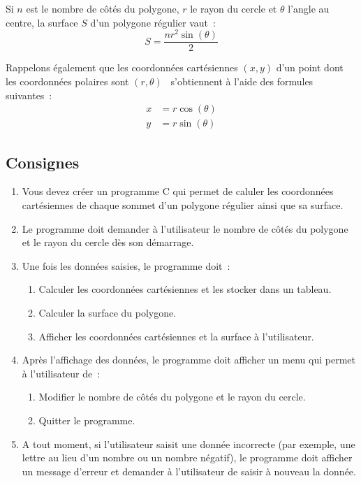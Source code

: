 \documentclass[12pt,addpoints,french,a4paper,oneside]{exam}
\begin{document}
Si \(n\) est le nombre de côtés du polygone, \(r\) le rayon du cercle et \(\theta{}\) l'angle au centre, la surface \(S\) d'un polygone régulier vaut~:
\begin{equation*}
	S = \frac{n r^2 \sin\left(\theta{}\right)}{2}
\end{equation*}

Rappelons également que les coordonnées cartésiennes \(\left(x, y\right)\) d'un point dont les coordonnées polaires sont \(\left(r, \theta{}\right)\)~ s'obtiennent à l'aide des formules suivantes~:
\begin{align*}
	x & = r \cos\left(\theta{}\right) \\
	y & = r \sin\left(\theta{}\right)
\end{align*}

\subsection*{Consignes}

\begin{enumerate}
	\item Vous devez créer un programme C qui permet de caluler les coordonnées cartésiennes de chaque sommet d'un polygone régulier ainsi que sa surface.
	\item Le programme doit demander à l'utilisateur le nombre de côtés du polygone et le rayon du cercle dès son démarrage.
	\item Une fois les données saisies, le programme doit~:
	      \begin{enumerate}
		      \item Calculer les coordonnées cartésiennes et les stocker dans un tableau.
		      \item Calculer la surface du polygone.
		      \item Afficher les coordonnées cartésiennes et la surface à l'utilisateur.
	      \end{enumerate}
	\item Après l'affichage des données, le programme doit afficher un menu qui permet à l'utilisateur de~:
	      \begin{enumerate}
		      \item Modifier le nombre de côtés du polygone et le rayon du cercle.
		      \item Quitter le programme.
	      \end{enumerate}
	\item A tout moment, si l'utilisateur saisit une donnée incorrecte (par exemple, une lettre au lieu d'un nombre ou un nombre négatif), le programme doit afficher un message d'erreur et demander à l'utilisateur de saisir à nouveau la donnée.
\end{enumerate}
\end{document}
